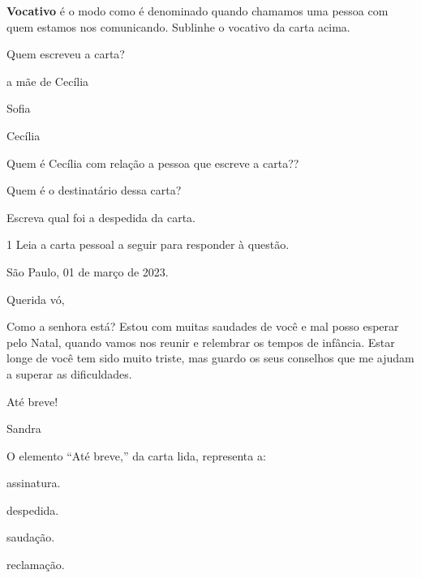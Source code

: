 \begin{escolha}
\item \textbf{Vocativo} é o modo como é denominado quando chamamos uma
pessoa com quem estamos nos comunicando. Sublinhe o vocativo da carta
acima.

\item Quem escreveu a carta?

\begin{boxlist}
\boxitem[\rosa{X}] a mãe de Cecília 

\boxitem[] Sofia

\boxitem[] Cecília
\end{boxlist}

\item Quem é Cecília com relação a pessoa que escreve a carta??


\item Quem é o destinatário dessa carta?


\item Escreva qual foi a despedida da carta. 

\end{escolha}


\num{1} Leia a carta pessoal a seguir para responder à questão.


\begin{mdframed}[linewidth=10pt,linecolor=salmao!20,backgroundcolor=salmao!20,roundcorner=20pt]
São Paulo, 01 de março de 2023.

Querida vó,

Como a senhora está? Estou com muitas saudades de você e mal posso
esperar pelo Natal, quando vamos nos reunir e relembrar os tempos de
infância. Estar longe de você tem sido muito triste, mas guardo os seus
conselhos que me ajudam a superar as dificuldades.

\begin{flushright}
Até breve!

Sandra
\end{flushright}
\end{mdframed}

O elemento ``Até breve,'' da carta lida, representa a:

\begin{escolha}
\item assinatura.

\item despedida.

\item saudação.

\item reclamação.
\end{escolha}

